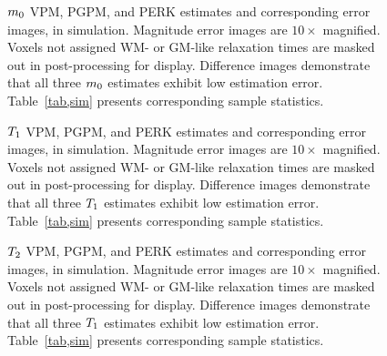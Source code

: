\begin{figure}[!ht]
	\centering
	\hspace{0cm}
	\caption{%
		$m_0$ VPM, PGPM, and PERK estimates
		and corresponding error images,
		in simulation.
		Magnitude error images are $10\times$ magnified.
		Voxels not assigned WM- or GM-like relaxation times
		are masked out in post-processing for display.
		Difference images demonstrate
		that all three $m_0$ estimates
		exhibit low estimation error.
		Table~\ref{tab,sim} presents
		corresponding sample statistics.
	}
	\label{fig,sim,m0}
\end{figure}
	
\begin{figure}[!ht]
	\centering
	\hspace{0cm}
	\caption{%
		$T_1$	VPM, PGPM, and PERK estimates
		and corresponding error images,
		in simulation.
		Magnitude error images are $10\times$ magnified.
		Voxels not assigned WM- or GM-like relaxation times
		are masked out in post-processing for display.
		Difference images demonstrate
		that all three $T_1$ estimates
		exhibit low estimation error.
		Table~\ref{tab,sim} presents
		corresponding sample statistics.
	}
	\label{fig,sim,t1}
\end{figure}

\begin{figure}[!ht]
	\centering
	\hspace{0cm}
	\caption{%
		$T_2$ VPM, PGPM, and PERK estimates
		and corresponding error images,
		in simulation.
		Magnitude error images are $10\times$ magnified.
		Voxels not assigned WM- or GM-like relaxation times
		are masked out in post-processing for display.
		Difference images demonstrate
		that all three $T_1$ estimates
		exhibit low estimation error.
		Table~\ref{tab,sim} presents
		corresponding sample statistics.
	}
	\label{fig,sim,t2}
\end{figure}

